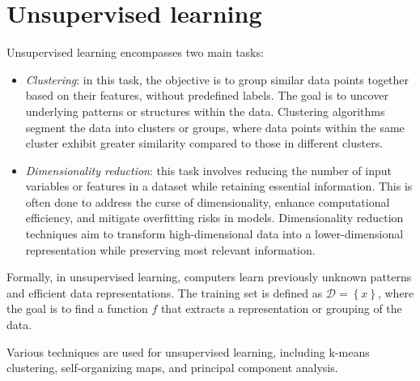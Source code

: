 \section{Unsupervised learning}

Unsupervised learning encompasses two main tasks:
\begin{itemize}
    \item \textit{Clustering}: in this task, the objective is to group similar data points together based on their features, without predefined labels. 
        The goal is to uncover underlying patterns or structures within the data. 
        Clustering algorithms segment the data into clusters or groups, where data points within the same cluster exhibit greater similarity compared to those in different clusters. 
    \item \textit{Dimensionality reduction}: this task involves reducing the number of input variables or features in a dataset while retaining essential information. 
        This is often done to address the curse of dimensionality, enhance computational efficiency, and mitigate overfitting risks in models. 
        Dimensionality reduction techniques aim to transform high-dimensional data into a lower-dimensional representation while preserving most relevant information.
\end{itemize}
Formally, in unsupervised learning, computers learn previously unknown patterns and efficient data representations.
The training set is defined as $\mathcal{D}=\left\{ x \right\}$, where the goal is to find a function $f$ that extracts a representation or grouping of the data.

Various techniques are used for unsupervised learning, including k-means clustering, self-organizing maps, and principal component analysis.